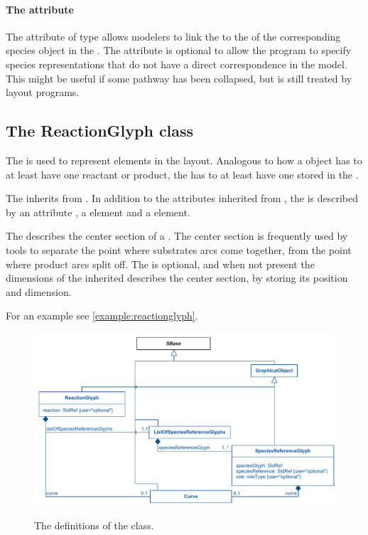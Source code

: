 \paragraph{The  attribute}
The  attribute of type  allows modelers 
to link the \SpeciesGlyph to the  of the corresponding species 
object in the \Model. The  attribute is optional to allow 
the program to specify species representations that do not have a direct 
correspondence in the model. This might be useful if some pathway has 
been collapsed, but is still treated by layout programs. 



\subsection{The ReactionGlyph class}
\label{reactionglyph-class}
The \ReactionGlyph is used to represent \Reaction elements in the 
layout. Analogous to how a \Reaction object has to at least have one reactant 
or product, the \ReactionGlyph has to at least have one 
\SpeciesReferenceGlyph stored in the \ListOfSpeciesReferenceGlyphs. 

The \ReactionGlyph inherits from \GraphicalObject. In addition to the 
attributes inherited from \GraphicalObject, the \ReactionGlyph is 
described by an attribute , a \Curve element and a 
 element. 

The \Curve describes the center section of a \ReactionGlyph. The center 
section is frequently used by tools to separate the point where 
substrates arcs come together, from the point where product arcs split 
off. The \Curve is optional, and when not present the dimensions of the 
inherited \BoundingBox describes the center section, by storing its 
position and dimension. 


For an example see \ref{example:reactionglyph}. 


\begin{figure}[!h]
\includegraphics[scale=0.9]{uml/layout-reactionglyph-model-uml}\\
\label{uml:reactionglyph}
\caption{The definitions of the \ReactionGlyph class.}
\end{figure}

